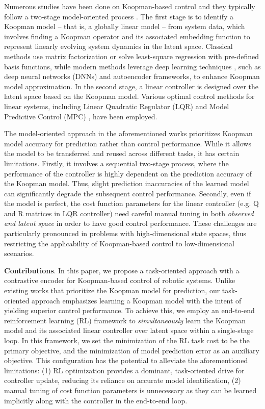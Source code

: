 \documentclass{article}
\begin{document}
Numerous studies have been done on Koopman-based control and they typically follow a two-stage model-oriented process \cite{han2020deep,shi2022deep,laferriere2021deep}. The first stage is to identify a Koopman model -- that is, a globally linear model -- from system data, which involves finding a Koopman operator and its associated embedding function to represent linearly evolving system dynamics in the latent space. Classical methods use matrix factorization or solve least-square regression with pre-defined basis functions, while modern methods leverage deep learning techniques \cite{lusch2018deep, shi2022deep, han2020deep, laferriere2021deep, xiao2021cknet, van2021deepkoco}, such as deep neural networks (DNNs) and autoencoder frameworks, to enhance Koopman model approximation. In the second stage, a linear controller is designed over the latent space based on the Koopman model. Various optimal control methods for linear systems, including Linear Quadratic Regulator (LQR) \cite{mamakoukas2019local, laferriere2021deep, shi2022deep} and Model Predictive Control (MPC) \cite{abraham2017model, kaiser2021data, korda2018linear, van2021deepkoco}, have been employed.


The model-oriented approach in the aforementioned works prioritizes Koopman model accuracy for prediction rather than control performance. While it allows the model to be transferred and reused across different tasks, it has certain limitations. Firstly, it involves a sequential two-stage process, where the performance of the controller is highly dependent on the prediction accuracy of the Koopman model. Thus, slight prediction inaccuracies of the learned model can significantly degrade the subsequent control performance. Secondly, even if the model is perfect, the cost function parameters for the linear controller (e.g. Q and R matrices in LQR controller) need careful manual tuning in both \textit{observed and latent space} in order to have good control performance. These challenges are particularly pronounced in problems with high-dimensional state spaces, thus restricting the applicability of Koopman-based control to low-dimensional scenarios.

\textbf{Contributions}. 
In this paper, we propose a task-oriented approach with a contrastive encoder for Koopman-based control of robotic systems. Unlike existing works that prioritize the Koopman model for prediction, our task-oriented approach emphasizes learning a Koopman model with the intent of yielding superior control performance.
%
To achieve this, we employ an end-to-end reinforcement learning (RL) framework to \textit{simultaneously} learn the Koopman model and its associated linear controller over latent space within a single-stage loop. In this framework, we set the minimization of the RL task cost to be the primary objective, and the minimization of model prediction error as an auxiliary objective.
%
This configuration has the potential to alleviate the aforementioned limitations: (1) RL optimization provides a dominant, task-oriented drive for controller update, reducing its reliance on accurate model identification, (2) manual tuning of cost function parameters is unnecessary as they can be learned implicitly along with the controller in the end-to-end loop.
\end{document}
